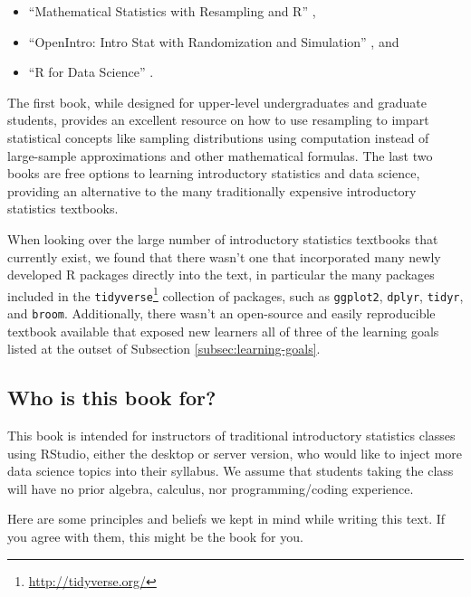 \documentclass[12pt, krantz2,]{krantz}
\providecommand{\tightlist}{%
  \setlength{\itemsep}{0pt}\setlength{\parskip}{0pt}}
\renewcommand{\href}[2]{#2\footnote{\url{#1}}}
\begin{document}
\begin{itemize}
\tightlist
\item
  ``Mathematical Statistics with Resampling and R'' \citep{hester2011},
\item
  ``OpenIntro: Intro Stat with Randomization and Simulation'' \citep{isrs2014}, and
\item
  ``R for Data Science'' \citep{rds2016}.
\end{itemize}

The first book, while designed for upper-level undergraduates and graduate students, provides an excellent resource on how to use resampling to impart statistical concepts like sampling distributions using computation instead of large-sample approximations and other mathematical formulas. The last two books are free options to learning introductory statistics and data science, providing an alternative to the many traditionally expensive introductory statistics textbooks.

When looking over the large number of introductory statistics textbooks that currently exist, we found that there wasn't one that incorporated many newly developed R packages directly into the text, in particular the many packages included in the \href{http://tidyverse.org/}{\texttt{tidyverse}} collection of packages, such as \texttt{ggplot2}, \texttt{dplyr}, \texttt{tidyr}, and \texttt{broom}. Additionally, there wasn't an open-source and easily reproducible textbook available that exposed new learners all of three of the learning goals listed at the outset of Subsection \ref{subsec:learning-goals}.

\hypertarget{who-is-this-book-for}{%
\subsection{Who is this book for?}\label{who-is-this-book-for}}

This book is intended for instructors of traditional introductory statistics classes using RStudio, either the desktop or server version, who would like to inject more data science topics into their syllabus. We assume that students taking the class will have no prior algebra, calculus, nor programming/coding experience.

Here are some principles and beliefs we kept in mind while writing this text. If you agree with them, this might be the book for you.
\end{document}
